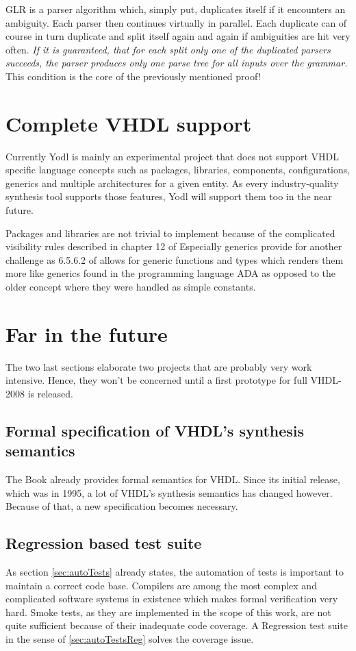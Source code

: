 GLR is a parser algorithm which, simply put, duplicates itself if it
encounters an ambiguity. Each parser then continues virtually in
parallel. Each duplicate can of course in turn duplicate and split
itself again and again if ambiguities are hit very often. \emph{If it is
guaranteed, that for each split only one of the duplicated parsers
succeeds, the parser produces only one parse tree for all inputs over
the grammar.} This condition is the core of the previously mentioned proof!

\section{Complete VHDL support}

Currently Yodl is mainly an experimental project that does not support
VHDL specific language concepts such as packages, libraries,
components, configurations, generics and multiple architectures for a
given entity. As every industry-quality synthesis tool supports those
features, Yodl will support them too in the near future.

Packages and libraries are not trivial to implement because of the
complicated visibility rules described in chapter 12 of \cite{IEEELRM}
Especially generics provide for another challenge as 6.5.6.2 of
\cite{IEEELRM}
allows for generic functions and types which renders them more
like generics found in the programming language ADA as opposed to the
older concept where they were handled as simple constants.

\section{Far in the future}
The two last sections elaborate two projects that are probably very
work intensive. Hence, they won't be concerned until a first prototype
for full VHDL-2008 is released.

\subsection{Formal specification of VHDL's synthesis semantics}
The Book \cite{VHDLFORM}
already provides formal semantics for VHDL. Since its initial
release, which was in 1995, a lot of VHDL's synthesis semantics has
changed however. Because of that, a new specification becomes necessary.

\subsection{Regression based test suite}

As section \ref{sec:autoTests}
already states, the automation of tests is important to maintain a
correct code base. Compilers are among the most complex and complicated
software systems in existence which makes formal verification very
hard. Smoke tests, as they are implemented in the scope of this work,
are not quite sufficient because of their inadequate code
coverage. A Regression test suite in the sense of
\ref{sec:autoTestsReg} solves the coverage issue.